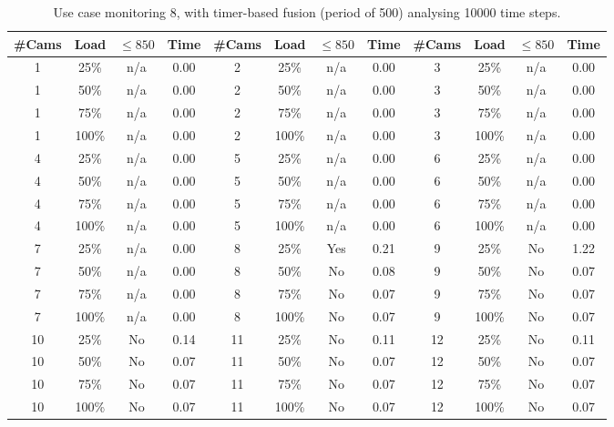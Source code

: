 \documentclass{article}
\begin{document}
\begin{table}
\centering
\begin{tabular}{|c|c|c|c|c|c|c|c|c|c|c|c|}
\hline
\#Cams & Load & $\leq 850$ & Time & \#Cams & Load & $\leq 850$ & Time & \#Cams & Load & $\leq 850$ & Time\\
\hline
1 & 25\% & n/a & 0.00 & 2 & 25\% & n/a & 0.00 & 3 & 25\% & n/a & 0.00\\
1 & 50\% & n/a & 0.00 & 2 & 50\% & n/a & 0.00 & 3 & 50\% & n/a & 0.00\\
1 & 75\% & n/a & 0.00 & 2 & 75\% & n/a & 0.00 & 3 & 75\% & n/a & 0.00\\
1 & 100\% & n/a & 0.00 & 2 & 100\% & n/a & 0.00 & 3 & 100\% & n/a & 0.00\\
\hline
4 & 25\% & n/a & 0.00 & 5 & 25\% & n/a & 0.00 & 6 & 25\% & n/a & 0.00\\
4 & 50\% & n/a & 0.00 & 5 & 50\% & n/a & 0.00 & 6 & 50\% & n/a & 0.00\\
4 & 75\% & n/a & 0.00 & 5 & 75\% & n/a & 0.00 & 6 & 75\% & n/a & 0.00\\
4 & 100\% & n/a & 0.00 & 5 & 100\% & n/a & 0.00 & 6 & 100\% & n/a & 0.00\\
\hline
7 & 25\% & n/a & 0.00 & 8 & 25\% & Yes & 0.21 & 9 & 25\% & No & 1.22\\
7 & 50\% & n/a & 0.00 & 8 & 50\% & No & 0.08 & 9 & 50\% & No & 0.07\\
7 & 75\% & n/a & 0.00 & 8 & 75\% & No & 0.07 & 9 & 75\% & No & 0.07\\
7 & 100\% & n/a & 0.00 & 8 & 100\% & No & 0.07 & 9 & 100\% & No & 0.07\\
\hline
10 & 25\% & No & 0.14 & 11 & 25\% & No & 0.11 & 12 & 25\% & No & 0.11\\
10 & 50\% & No & 0.07 & 11 & 50\% & No & 0.07 & 12 & 50\% & No & 0.07\\
10 & 75\% & No & 0.07 & 11 & 75\% & No & 0.07 & 12 & 75\% & No & 0.07\\
10 & 100\% & No & 0.07 & 11 & 100\% & No & 0.07 & 12 & 100\% & No & 0.07\\
\hline
\end{tabular}
\caption{Use case monitoring 8, with timer-based fusion (period of 500) analysing 10000 time steps.}
\end{table}
\end{document}
